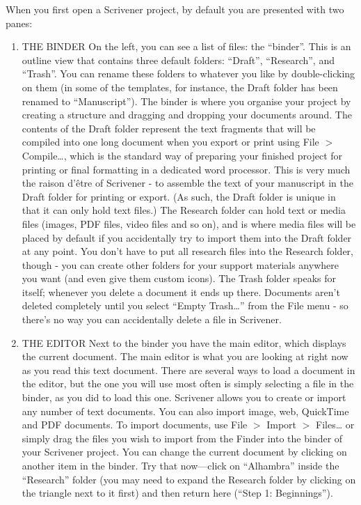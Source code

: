 \documentclass[10pt,oneside]{memoir}
\begin{document}
When you first open a Scrivener project, by default you are presented with two panes:


\begin{enumerate}


\item THE BINDER
On the left, you can see a list of files: the ``binder''. This is an outline view that contains three default folders: ``Draft'', ``Research'', and ``Trash''. You can rename these folders to whatever you like by double-clicking on them (in some of the templates, for instance, the Draft folder has been renamed to ``Manuscript''). The binder is where you organise your project by creating a structure and dragging and dropping your documents around.
The contents of the Draft folder represent the text fragments that will be compiled into one long document when you export or print using File $>$ Compile{\ldots}, which is the standard way of preparing your finished project for printing or final formatting in a dedicated word processor. This is very much the raison d'être of Scrivener - to assemble the text of your manuscript in the Draft folder for printing or export. (As such, the Draft folder is unique in that it can only hold text files.)
The Research folder can hold text or media files (images, PDF files, video files and so on), and is where media files will be placed by default if you accidentally try to import them into the Draft folder at any point. You don't have to put all research files into the Research folder, though - you can create other folders for your support materials anywhere you want (and even give them custom icons).
The Trash folder speaks for itself; whenever you delete a document it ends up there. Documents aren't deleted completely until you select ``Empty Trash{\ldots}'' from the File menu - so there's no way you can accidentally delete a file in Scrivener.




\item THE EDITOR
Next to the binder you have the main editor, which displays the current document. The main editor is what you are looking at right now as you read this text document. There are several ways to load a document in the editor, but the one you will use most often is simply selecting a file in the binder, as you did to load this one. Scrivener allows you to create or import any number of text documents. You can also import image, web, QuickTime and PDF documents. To import documents, use File $>$ Import $>$ Files{\ldots} or simply drag the files you wish to import from the Finder into the binder of your Scrivener project.
You can change the current document by clicking on another item in the binder. Try that now---click on ``Alhambra'' inside the ``Research'' folder (you may need to expand the Research folder by clicking on the triangle next to it first) and then return here (``Step 1: Beginnings'').



\end{enumerate}
\end{document}
